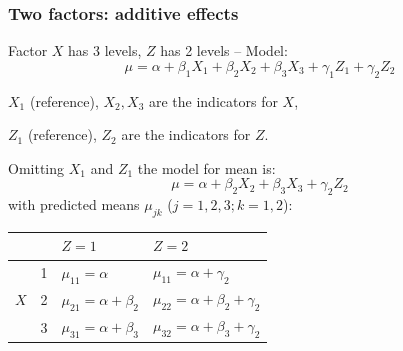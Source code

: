 \documentclass[12pt,dvipsnames,t,handout%
,aspectratio=169%
]{beamer}
\begin{document}

\begin{frame}[fragile]\frametitle{Two factors: additive effects}

\bi
\item
Factor $X$ has 3 levels, $Z$ has 2 levels -- Model:
\[
\mu=\alpha+\beta_1 X_1+ \beta_2 X_2+\beta_3 X_3+\gamma_1 Z_1 +\gamma_2 Z_2
\]
\item
$X_1$ (reference), $X_2, X_3$ are the indicators for $X$,  
\medskip
\item
$Z_1$ (reference), $Z_2$ are the indicators for $Z$.
\medskip
\item
Omitting $X_1$ and $Z_1$ the model for mean is:
\[
\mu=\alpha+\beta_2 X_2+\beta_3 X_3 +\gamma_2 Z_2
\]
with predicted means $\mu_{jk}$ ($j=1,2,3; k = 1,2$):
\begin{center}
\begin{tabular}{llll}
&& $Z= 1$ & $Z = 2$ \\
\hline
&1 & $\mu_{11} = \alpha$ & $\mu_{11} = \alpha + \gamma_2$\\
$X$&2 & $\mu_{21} = \alpha+\beta_2$ & $\mu_{22} = \alpha +\beta_2+ \gamma_2$\\
&3 & $\mu_{31}= \alpha+\beta_3$ & $\mu_{32} = \alpha +\beta_3+ \gamma_2$
\end{tabular}
\end{center}
\ei
\vfill

\end{frame}
\end{document}
